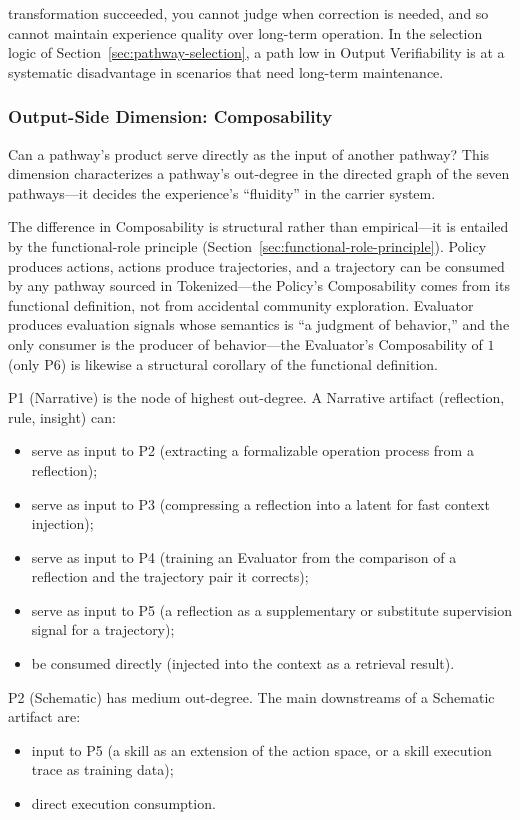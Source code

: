 transformation succeeded, you cannot judge when correction is needed, and so cannot maintain experience quality over long-term operation. In the selection logic of Section~\ref{sec:pathway-selection}, a path low in Output Verifiability is at a systematic disadvantage in scenarios that need long-term maintenance.

\subsubsection{Output-Side Dimension: Composability}

Can a pathway's product serve directly as the input of another pathway? This dimension characterizes a pathway's out-degree in the directed graph of the seven pathways---it decides the experience's ``fluidity'' in the carrier system.

The difference in Composability is structural rather than empirical---it is entailed by the functional-role principle (Section~\ref{sec:functional-role-principle}). Policy produces actions, actions produce trajectories, and a trajectory can be consumed by any pathway sourced in Tokenized---the Policy's Composability comes from its functional definition, not from accidental community exploration. Evaluator produces evaluation signals whose semantics is ``a judgment of behavior,'' and the only consumer is the producer of behavior---the Evaluator's Composability of $1$ (only P6) is likewise a structural corollary of the functional definition.

P1 (Narrative) is the node of highest out-degree. A Narrative artifact (reflection, rule, insight) can:
\begin{itemize}
  \item serve as input to P2 (extracting a formalizable operation process from a reflection);
  \item serve as input to P3 (compressing a reflection into a latent for fast context injection);
  \item serve as input to P4 (training an Evaluator from the comparison of a reflection and the trajectory pair it corrects);
  \item serve as input to P5 (a reflection as a supplementary or substitute supervision signal for a trajectory);
  \item be consumed directly (injected into the context as a retrieval result).
\end{itemize}

P2 (Schematic) has medium out-degree. The main downstreams of a Schematic artifact are:
\begin{itemize}
  \item input to P5 (a skill as an extension of the action space, or a skill execution trace as training data);
  \item direct execution consumption.
\end{itemize}

